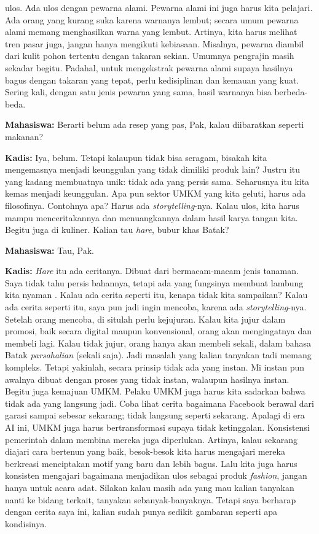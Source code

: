 {ulos. Ada ulos dengan pewarna alami. Pewarna alami ini juga harus kita pelajari. Ada orang yang kurang suka karena warnanya lembut; secara umum pewarna alami memang menghasilkan warna yang lembut. Artinya, kita harus melihat tren pasar juga, jangan hanya mengikuti kebiasaan. Misalnya, pewarna diambil dari kulit pohon tertentu dengan takaran sekian. Umumnya pengrajin masih sekadar begitu. Padahal, untuk mengekstrak pewarna alami supaya hasilnya bagus dengan takaran yang tepat, perlu kedisiplinan dan kemauan yang kuat. Sering kali, dengan satu jenis pewarna yang sama, hasil warnanya bisa berbeda-beda.

\noindent \textbf{Mahasiswa:} Berarti belum ada resep yang pas, Pak, kalau diibaratkan seperti makanan?

\noindent \textbf{Kadis:} Iya, belum. Tetapi kalaupun tidak bisa seragam, bisakah kita mengemasnya menjadi keunggulan yang tidak dimiliki produk lain? Justru itu yang kadang membuatnya unik: tidak ada yang persis sama. Seharusnya itu kita kemas menjadi keunggulan. Apa pun sektor UMKM yang kita geluti, harus ada filosofinya. Contohnya apa? Harus ada \textit{storytelling}-nya. Kalau ulos, kita harus mampu menceritakannya dan menuangkannya dalam hasil karya tangan kita. Begitu juga di kuliner. Kalian tau \textit{hare}, bubur khas Batak?

\noindent \textbf{Mahasiswa:} Tau, Pak.

\noindent \textbf{Kadis:} \textit{Hare} itu ada ceritanya. Dibuat dari bermacam-macam jenis tanaman. Saya tidak tahu persis bahannya, tetapi ada yang fungsinya membuat lambung kita nyaman . Kalau ada cerita seperti itu, kenapa tidak kita sampaikan? Kalau ada cerita seperti itu, saya pun jadi ingin mencoba, karena ada \textit{storytelling}-nya. Setelah orang mencoba, di situlah perlu kejujuran. Kalau kita jujur dalam promosi, baik secara digital maupun konvensional, orang akan mengingatnya dan membeli lagi. Kalau tidak jujur, orang hanya akan membeli sekali, dalam bahasa Batak \textit{parsahalian} (sekali saja). Jadi masalah yang kalian tanyakan tadi memang kompleks. Tetapi yakinlah, secara prinsip tidak ada yang instan. Mi instan pun awalnya dibuat dengan proses yang tidak instan, walaupun hasilnya instan. Begitu juga kemajuan UMKM. Pelaku UMKM juga harus kita sadarkan bahwa tidak ada yang langsung jadi. Coba lihat cerita bagaimana Facebook berawal dari garasi sampai sebesar sekarang; tidak langsung seperti sekarang. Apalagi di era AI ini, UMKM juga harus bertransformasi supaya tidak ketinggalan. Konsistensi pemerintah dalam membina mereka juga diperlukan. Artinya, kalau sekarang diajari cara bertenun yang baik, besok-besok kita harus mengajari mereka berkreasi menciptakan motif yang baru dan lebih bagus. Lalu kita juga harus konsisten mengajari bagaimana menjadikan ulos sebagai produk \textit{fashion}, jangan hanya untuk acara adat. Silakan kalau masih ada yang mau kalian tanyakan nanti ke bidang terkait, tanyakan sebanyak-banyaknya. Tetapi saya berharap dengan cerita saya ini, kalian sudah punya sedikit gambaran seperti apa kondisinya.

}

